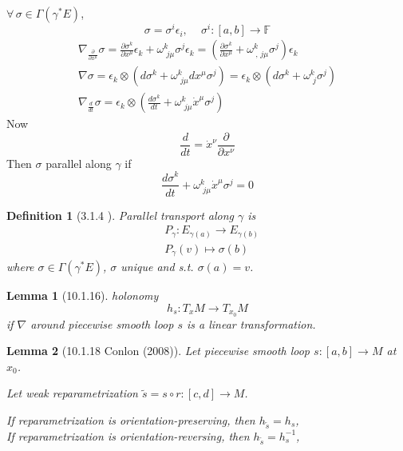 \documentclass[10pt]{amsart}
\newtheorem{lemma}{Lemma}
\newtheorem{definition}{Definition}
\begin{document}
\begin{multicols*}{2}
$\forall \, \sigma \in \Gamma(\gamma^*E)$,  
\[
\sigma  = \sigma^i \epsilon_i, \quad \, \sigma^i: [a,b] \to \mathbb{F}
\]
\[
\begin{gathered}
	\nabla_{ \frac{ \partial }{ \partial x^{\mu} } } \sigma = \frac{ \partial \sigma^k}{ \partial x^{\mu}  } \epsilon_k + \omega^k_{ \, \, j \mu } \sigma^j \epsilon_k = \left( \frac{ \partial \sigma ^k }{ \partial x^{\mu } } + \omega^k_{ \ , \, j \mu} \sigma^j  \right)  \epsilon_k \\ 
 \nabla \sigma = \epsilon_k \otimes ( d\sigma^k + \omega^k_{ \, \, j \mu} dx^{\mu} \sigma^j ) = \epsilon_k \otimes (d\sigma^k + \omega^k_{ \, \, j} \sigma^j  )  \\
 \nabla_{ \frac{d}{dt} } \sigma = \epsilon_k \otimes \left( \frac{d\sigma^k }{ dt } + \omega^k_{ \, \, j \mu } \dot{x}^{\mu} \sigma^j  \right)
\end{gathered}
\]
Now
\[
\frac{d}{dt} = \dot{x}^{\nu} \frac{ \partial }{ \partial x^{\nu } }
\]
Then $\sigma$ parallel along $\gamma$ if 
\[
\frac{ d\sigma^k}{ dt} + \omega^k_{ \, \, j\mu} \dot{x}^{\mu} \sigma^j = 0 
\]
\begin{definition}[3.1.4 \cite{ClSa2012}]  Parallel transport along $\gamma$ is 
\begin{equation}
\begin{aligned}
	& P_{\gamma} : E_{\gamma(a)} \to E_{\gamma(b)} \\ 
	& P_{\gamma}(v) \mapsto \sigma(b)
\end{aligned}
\end{equation}
where $\sigma \in \Gamma(\gamma^*E)$, $\sigma$ unique and s.t. $\sigma(a)=v$.  
\end{definition}







\begin{lemma}[10.1.16\cite{Conl2008}]
	holonomy 
	\[
	h_s:T_xM \to T_{x_0}M
	\]
	if $\nabla$ around piecewise smooth loop $s$ is a linear transformation.  
\end{lemma}






\begin{lemma}[10.1.18 Conlon (2008)\cite{Conl2008}] 
	Let piecewise smooth loop $s:[a,b] \to M$ at $x_0$.  

Let weak reparametrization $\widetilde{s} = s\circ r: [c,d] \to M$.  

If reparametrization is orientation-preserving, then $h_{\widetilde{s}} = h_s$, \\
If reparametrization is orientation-reversing, then $h_{\widetilde{s}} = h^{-1}_s$, 


\end{lemma}
\end{multicols*}
\end{document}
